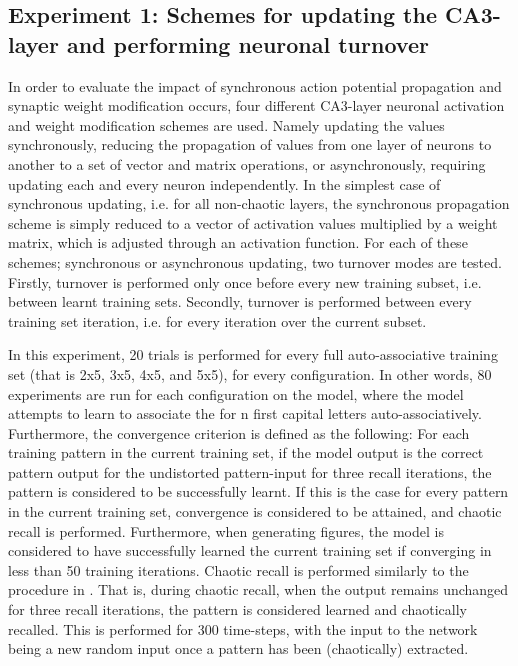 \subsection{Experiment 1: Schemes for updating the CA3-layer and performing neuronal turnover}

In order to evaluate the impact of synchronous action potential propagation and synaptic weight modification occurs, four different CA3-layer neuronal activation and weight modification schemes are used. Namely updating the values synchronously, reducing the propagation of values from one layer of neurons to another to a set of vector and matrix operations, or asynchronously, requiring updating each and every neuron independently. In the simplest case of synchronous updating, i.e. for all non-chaotic layers, the synchronous propagation scheme is simply reduced to a vector of activation values multiplied by a weight matrix, which is adjusted through an activation function. For each of these schemes; synchronous or asynchronous updating, two turnover modes are tested. Firstly, turnover is performed only once before every new training subset, i.e. between learnt training sets. Secondly, turnover is performed between every training set iteration, i.e. for every iteration over the current subset.

In this experiment, 20 trials is performed for every full auto-associative training set (that is 2x5, 3x5, 4x5, and 5x5), for every configuration. In other words, 80 experiments are run for each configuration on the model, where the model attempts to learn to associate the for n first capital letters auto-associatively. Furthermore, the convergence criterion is defined as the following: For each training pattern in the current training set, if the model output is the correct pattern output for the undistorted pattern-input for three recall iterations, the pattern is considered to be successfully learnt. If this is the case for every pattern in the current training set, convergence is considered to be attained, and chaotic recall is performed. Furthermore, when generating figures, the model is considered to have successfully learned the current training set if converging in less than 50 training iterations. Chaotic recall is performed similarly to the procedure in \citep{Hattori2010, Hattori2014}. That is, during chaotic recall, when the output remains unchanged for three recall iterations, the pattern is considered learned and chaotically recalled. This is performed for 300 time-steps, with the input to the network being a new random input once a pattern has been (chaotically) extracted.


